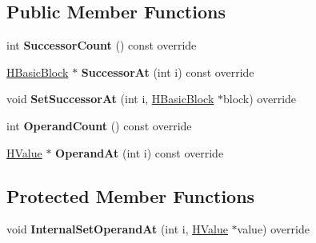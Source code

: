 \subsection*{Public Member Functions}
\begin{DoxyCompactItemize}
\item 
int {\bfseries Successor\+Count} () const  override\hypertarget{classv8_1_1internal_1_1_h_template_control_instruction_a68f1a740c0a071ef2a4e39d65a6762d7}{}\label{classv8_1_1internal_1_1_h_template_control_instruction_a68f1a740c0a071ef2a4e39d65a6762d7}

\item 
\hyperlink{classv8_1_1internal_1_1_h_basic_block}{H\+Basic\+Block} $\ast$ {\bfseries Successor\+At} (int i) const  override\hypertarget{classv8_1_1internal_1_1_h_template_control_instruction_ad30e30c7589672eb953b49437151b149}{}\label{classv8_1_1internal_1_1_h_template_control_instruction_ad30e30c7589672eb953b49437151b149}

\item 
void {\bfseries Set\+Successor\+At} (int i, \hyperlink{classv8_1_1internal_1_1_h_basic_block}{H\+Basic\+Block} $\ast$block) override\hypertarget{classv8_1_1internal_1_1_h_template_control_instruction_ae2ed9a8b549b02a301c2ceba3184a48c}{}\label{classv8_1_1internal_1_1_h_template_control_instruction_ae2ed9a8b549b02a301c2ceba3184a48c}

\item 
int {\bfseries Operand\+Count} () const  override\hypertarget{classv8_1_1internal_1_1_h_template_control_instruction_a1f17a1be62868e8d58c4f939a927d81e}{}\label{classv8_1_1internal_1_1_h_template_control_instruction_a1f17a1be62868e8d58c4f939a927d81e}

\item 
\hyperlink{classv8_1_1internal_1_1_h_value}{H\+Value} $\ast$ {\bfseries Operand\+At} (int i) const  override\hypertarget{classv8_1_1internal_1_1_h_template_control_instruction_aee2dbcbf37d9da433f1d7738745a435d}{}\label{classv8_1_1internal_1_1_h_template_control_instruction_aee2dbcbf37d9da433f1d7738745a435d}

\end{DoxyCompactItemize}
\subsection*{Protected Member Functions}
\begin{DoxyCompactItemize}
\item 
void {\bfseries Internal\+Set\+Operand\+At} (int i, \hyperlink{classv8_1_1internal_1_1_h_value}{H\+Value} $\ast$value) override\hypertarget{classv8_1_1internal_1_1_h_template_control_instruction_a39ad6319102a553efe8bec201178e884}{}\label{classv8_1_1internal_1_1_h_template_control_instruction_a39ad6319102a553efe8bec201178e884}

\end{DoxyCompactItemize}
